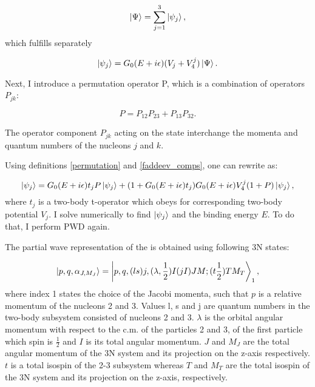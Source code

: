     \begin{equation}
        \ket{\Psi} = \sum_{j=1}^3 \ket{\psi_j},
        \label{faddeev_comps}
    \end{equation}
    which fulfills separately

    \begin{equation}
        \ket{\psi_j} = G_0(E+i\epsilon)(V_j + V_4^j) \ket{\Psi}.
        \label{psi3_component}
    \end{equation}

    Next, I introduce a permutation operator P, which is a combination
    of operators $P_{jk}$:
    
    \begin{equation}
        P = P_{12}P_{23} + P_{13}P_{32}.
        \label{permutation}
    \end{equation}

    The operator component $P_{jk}$ acting on the state interchange the momenta and  
    quantum numbers of the nucleons $j$ and $k$.

    Using definitions \ref{permutation} and \ref{faddeev_comps},
    one can rewrite  as:

    \begin{equation}
        \ket{\psi_j} = G_0(E+i\epsilon)t_j P \ket{\psi_j} + 
        (1 + G_0(E+i\epsilon)t_j)G_0(E+i\epsilon)V_4^j(1+P)\ket{\psi_j},
        \label{fadeed_lse}
    \end{equation}
    where $t_j$ is a two-body t-operator which obeys  for corresponding 
    two-body potential $V_j$. I solve  numerically to find $\ket{\psi_j}$
    and the binding energy $E$. To do that, I perform PWD again.

The partial wave representation of the  is obtained using
following 3N states:

\begin{equation}
    \ket{p,q,\alpha_{J,M_J}} = \ket{p,q,(ls)j, (\lambda, \frac{1}{2})I(jI)JM;(t\frac{1}{2})TM_T}_1,
    \label{3N_PW}
\end{equation}
where index 1 states the choice of the Jacobi momenta, such that $p$ is a relative momentum of the nucleons 2 and 3.
Values l, s and j are quantum numbers in the two-body subsystem consisted of nucleons 2 and 3. $\lambda$ is the 
orbital angular momentum with respect to the c.m. of the particles 2 and 3,
of the first particle which spin is $\frac{1}{2}$
and $I$ is its total angular momentum.
$J$ and $M_J$ are the total angular momentum of the 3N system and its projection on the z-axis respectively.
$t$ is a total isospin of the 2-3 subsystem whereas $T$ and $M_T$ are the total isospin of the 3N system and its projection on the z-axis, respectively.  

